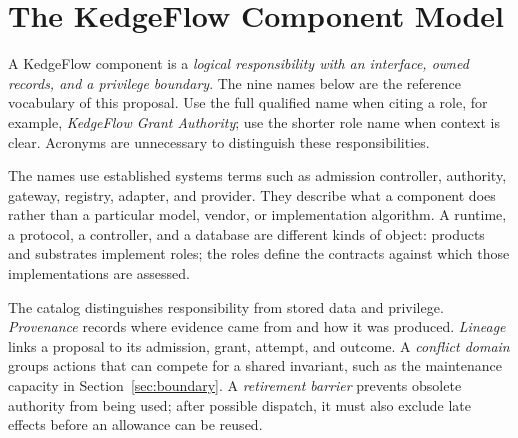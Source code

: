 \section{The KedgeFlow Component Model}
\label{sec:components}

A KedgeFlow component is a \emph{logical responsibility with an interface, owned records, and a privilege boundary}. The nine names below are the reference vocabulary of this proposal. Use the full qualified name when citing a role, for example, \emph{KedgeFlow Grant Authority}; use the shorter role name when context is clear. Acronyms are unnecessary to distinguish these responsibilities.

The names use established systems terms such as admission controller, authority, gateway, registry, adapter, and provider. They describe what a component does rather than a particular model, vendor, or implementation algorithm. A runtime, a protocol, a controller, and a database are different kinds of object: products and substrates implement roles; the roles define the contracts against which those implementations are assessed.

The catalog distinguishes responsibility from stored data and privilege. \emph{Provenance} records where evidence came from and how it was produced. \emph{Lineage} links a proposal to its admission, grant, attempt, and outcome. A \emph{conflict domain} groups actions that can compete for a shared invariant, such as the maintenance capacity in Section~\ref{sec:boundary}. A \emph{retirement barrier} prevents obsolete authority from being used; after possible dispatch, it must also exclude late effects before an allowance can be reused.


